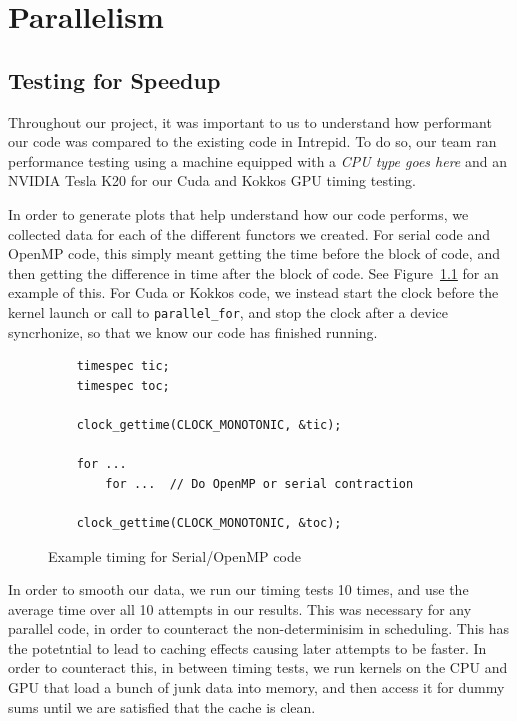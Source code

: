 \chapter{Parallelism}

\section{Testing for Speedup}

Throughout our project, it was important to us to understand how performant our code was compared to the existing code in Intrepid.
To do so, our team ran performance testing using a machine equipped with a \emph{CPU type goes here} %
and an NVIDIA Tesla K20 for our Cuda and Kokkos GPU timing testing. 

In order to generate plots that help understand how our code performs, we collected data for each of the different functors we created.
For serial code and OpenMP code, this simply meant getting the time before the block of code, and then getting the difference in time
after the block of code. See Figure~\ref{lst:OMPTiming} for an example of this. For Cuda or Kokkos code, we instead start the clock before the kernel launch or call to \texttt{parallel\_for}, and stop the clock after a device syncrhonize, so that we know our code has finished running.

\begin{figure}[ht]
    \begin{lstlisting}
    timespec tic;
    timespec toc;
    
    clock_gettime(CLOCK_MONOTONIC, &tic);
    
    for ...
    	for ...  // Do OpenMP or serial contraction
    
    clock_gettime(CLOCK_MONOTONIC, &toc);
 \end{lstlisting}
\caption{Example timing for Serial/OpenMP code}
\label{lst:OMPTiming}
\end{figure}

In order to smooth our data, we run our timing tests 10 times, and use the average time over all 10 attempts in our results. This was necessary for any parallel 
code, in order to counteract the non-determinisim in scheduling. This has the potetntial to lead to caching effects causing later attempts to be faster. In order 
to counteract this, in between timing tests, we run kernels on the CPU and GPU that load a bunch of junk data into memory, and then access it for dummy sums until we are 
satisfied that the cache is clean. 

